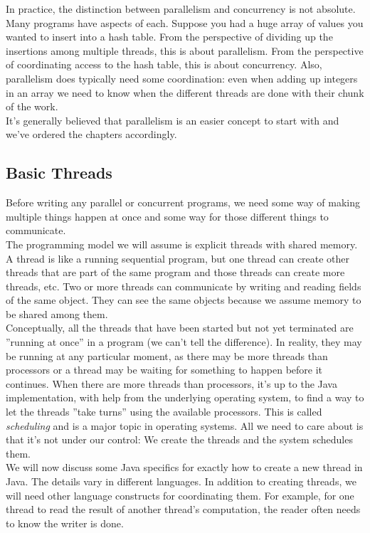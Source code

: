 \documentclass[main]{subfiles}
\begin{document}
In practice, the distinction between parallelism and concurrency is not absolute.  Many programs have aspects of each. Suppose you had a huge array of values you wanted to insert into a hash table. From the perspective of dividing up the insertions among multiple threads, this is about parallelism. From the perspective of coordinating access to the hash table, this is about concurrency. Also, parallelism does typically need some coordination: even when adding up integers in an array we need to know when the different threads are done with their chunk of the work.\\[3mm]
It's generally believed that parallelism is an easier concept to start with and we've ordered the chapters accordingly.

\subsection{Basic Threads}
Before writing any parallel or concurrent programs, we need some way of making multiple things happen at once and some way for those different things to communicate.\\[3mm]
The programming model we will assume is explicit threads with shared memory. A thread is like a running sequential program, but one thread can create other threads that are part of the same program and those threads can create more threads, etc. Two or more threads can communicate by writing and reading fields of the same object. They can see the same objects because we assume memory to be shared among them.\\[3mm]
Conceptually, all the threads that have been started but not yet terminated are ''running at once'' in a program (we can't tell the difference). In reality, they may be running at any particular moment, as there may be more threads than processors or a thread may be waiting for something to happen before it continues. When there are more threads than processors, it's up to the Java implementation, with help from the underlying operating system, to find a way to let the threads ''take turns'' using the available processors. This is called \textit{scheduling} and is a major topic in operating systems. All we need to care about is that it's not under our control: We create the threads and the system schedules them.\\[3mm]
We will now discuss some Java specifics for exactly how to create a new thread in Java. The details vary in different languages. In addition to creating threads, we will need other language constructs for coordinating them. For example, for one thread to read the result of another thread's computation, the reader often needs to know the writer is done.\\[3mm]
\end{document}
